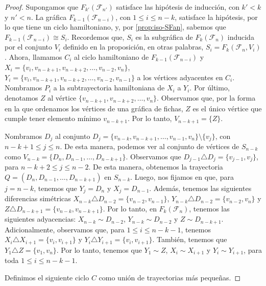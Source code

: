 \begin{proof}
    Supongamos que $F_{k'}(\mathcal{F}_{n'})$ satisface las hip\'otesis de
    inducci\'on, con $k'< k$ y $n'<n$. La gr\'afica
    $F_{k-1}(\mathcal{F}_{n-i})$, con $1 \leq i \leq n-k$, satisface la
    hip\'otesis, por lo que tiene un ciclo hamiltoniano, y, por
    \cref{prop:iso-SFan}, sabemos que $F_{k-1}(\mathcal{F}_{n-i}) \cong S_i$.
    Recordemos que,  $S_i$ es la subgr\'afica de $F_k(\mathcal{F}_n)$ inducida
    por el conjunto $V_i$ definido en la proposici\'on, en otras palabras, $S_i=
    F_k(\mathcal{F}_n, V_i)$. Ahora, llamamos $C_i$ al ciclo hamiltoniano de
    $F_{k-1}(\mathcal{F}_{n-i})$ y $X_i = \{v_i, v_{n-k+1}, v_{n-k+2}, \dots,
    v_{n-2}, v_n\}$, $Y_i= \{v_i, v_{n-k+1}, v_{n-k+2}, \dots, v_{n-2},
    v_{n-1}\}$ a los v\'ertices adyacentes en $C_i$. Nombramos $P_i$ a la
    subtrayectoria hamiltoniana de $X_i$ a $Y_i$. Por \'ultimo, denotamos $Z$ al
    v\'ertice $\{v_{n-k+1}, v_{n-k+2}, \dots, v_n\}$. Observamos que, por la
    forma en la que ordenamos los v\'ertices de una gr\'afica de fichas, $Z$ es
    el \'unico v\'ertice que cumple tener elemento m\'inimo $v_{n-k+1}$. Por lo
    tanto, $V_{n-k+1} = \{Z\}$. 
    
    Nombramos $D_j$ al conjunto $D_j =\{v_{n-k}, v_{n-k+1}, \dots, v_{n-1},
    v_n\} \setminus \{v_j\}$, con $n-k+1 \leq j \leq n$.  De esta manera,
    podemos ver al conjunto de v\'ertices de $S_{n-k}$ como $V_{n-k}=\{D_n,
    D_{n-1}, \dots, D_{n-k+1}\}$. Observamos que $D_{j-1} \triangle D_j=
    \{v_{j-1}, v_j\}$, para $n-k+2 \leq j \leq n-2$. De esta manera, obtenemos
    la trayectoria $Q= (D_n, D_{n-1}, \dots, D_{n-k+1})$ en $S_{n-k}$.     
    Luego, nos fijamos en que, para $j= n-k$, tenemos que $Y_j = D_n$ y $X_j=
    D_{n-1}$. Adem\'as, tenemos las siguientes diferencias sim\'etricas
    $X_{n-k}\triangle D_{n-2} =\{v_{n-2}, v_{n-1}\}$, $Y_{n-k}\triangle D_{n-2}
    =\{v_{n-2}, v_n\}$ y $Z\triangle D_{n-k+1} =\{v_{n-k}, v_{n-k+1}\}$. Por lo
    tanto, en $F_k(\mathcal{F}_n)$, tenemos las siguientes adyacencias: $X_{n-k}
    \sim D_{n-2}$, $Y_{n-k} \sim D_{n-2}$ y $Z \sim D_{n-k+1}$. Adicionalmente,
    observamos que, para $1 \leq i \leq n- k- 1$, tenemos $X_{i} \triangle
    X_{i+1}= \{v_i, v_{i+1}\}$ y $Y_i \triangle Y_{i+1} = \{v_i, v_{i+1}\}$.
    Tambi\'en, tenemos que $Y_1 \triangle Z = \{v_1, v_n\}$. Por lo tanto,
    tenemos que $Y_1 \sim Z$, $X_i \sim X_{i+1}$ y $Y_i \sim Y_{i+1}$, para toda
    $1 \leq i \leq n-k-1$.
            
    Definimos el siguiente ciclo $C$ como uni\'on de trayectorias m\'as
    peque\~{n}as.
    

\end{proof}
